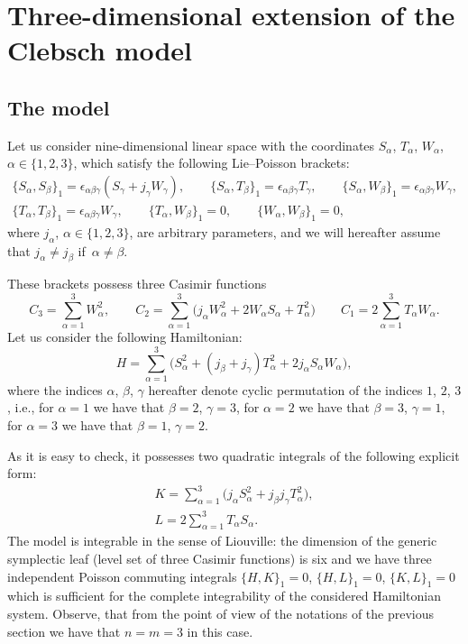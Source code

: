\documentclass[10pt,a4paper]{amsart}
\def\a{\alpha}
\def\b{\beta}
\def\g{\gamma}
\def\e{\epsilon}
\numberwithin{equation}{section}
\begin{document}
\section{Three-dimensional extension of the Clebsch model}\label{sec3}
\subsection{The model}
Let us consider nine-dimensional linear space with the
coordinates $S_{\a}$, $T_{\a}$, $W_{\a}$, $\a\in \{1,2,3\}$, which satisfy the
 following Lie--Poisson brackets:
 \begin{subequations}\label{e3lpb}
\begin{gather}
\{ S_{\a}, S_{\b}\}_1=\e_{\a\b\g}(S_{\g}+ j_{\g} W_{\g}), \qquad \{ S_{\a},
T_{\b}\}_1=\e_{\a\b\g}T_{\g},\qquad \{ S_{\a}, W_{\b}\}_1= \e_{\a\b\g} W_{\g},\label{e3lpb1}
\\
\{ T_{\a}, T_{\b}\}_1=\e_{\a\b\g} W_{\g}, \qquad \{ T_{\a},
W_{\b}\}_1=0,\qquad \{ W_{\a}, W_{\b}\}_1= 0,\label{e3lpb2}
\end{gather}
\end{subequations}
where $j_{\a}$, $\a\in \{1,2,3\}$, are arbitrary parameters, and we will hereafter assume
 that $j_{\a}\neq j_{\b}$ if~${\a\neq \b}$.

These brackets possess three Casimir functions
\begin{equation}\label{casimir}
C_3= \sum_{\a=1}^3 W^2_{\a},\qquad C_2= \sum_{\a=1}^3 \big(j_{\a} W^2_{\a} + 2 W_{\a}S_{\a} +T_{\a}^2 \big) \qquad C_1= 2\sum_{\a=1}^3T_{\a}W_{\a}.
\end{equation}
Let us consider the following Hamiltonian:
\begin{equation}\label{h}
H =\sum\limits_{\a=1}^3 \big(S_{\a}^2+ (j_{\b}+j_{\g}) T^2_{\a}+ 2 j_{\a} S_{\a} W_{\a}\big),
\end{equation}
where the indices $\a$, $\b$, $\g$ hereafter denote cyclic permutation of the indices $1$, $2$, $3$, i.e., for $\a=1$ we have that $\b=2$, $\g=3$, for $\a=2$ we have that $\b=3$, $\g=1$, for $\a=3$ we have that $\b=1$, $\g=2$.

As it is easy to check, it possesses two quadratic integrals
 of the following explicit form:
\begin{gather}
K= \sum\limits_{\a=1}^3 \big(j_{\a} S_{\a}^2+ j_{\b}j_{\g} T^2_{\a}\big), \label{k}
\\
L=2\sum_{\a=1}^3T_{\a}S_{\a}.\label{l}
\end{gather}
The model is integrable in the sense of Liouville: the dimension
of the generic symplectic leaf (level set of three Casimir
functions) is six and we have three independent Poisson commuting integrals
$\{H,K\}_1=0$, $ \{H,L\}_1=0$, $ \{K,L\}_1=0$
which is sufficient for the complete integrability of the
considered Hamiltonian system. Observe, that from the point of
view of the notations of the previous section we have that $n=m=3$ in this case.
\end{document}
